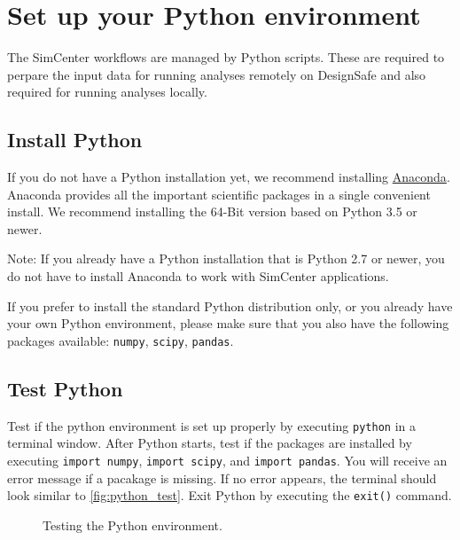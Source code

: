 \section{Set up your Python environment}

The SimCenter workflows are managed by Python scripts. These are required to perpare the input data for running analyses remotely on DesignSafe and also required for running analyses locally. 

\subsection{Install Python}

If you do not have a Python installation yet, we recommend installing \href{http://www.anaconda.com/distribution/#download-section}{Anaconda}. Anaconda provides all the important scientific packages in a single convenient install. We recommend installing the 64-Bit version based on Python 3.5 or newer.

Note: If you already have a Python installation that is Python 2.7 or newer, you do not have to install Anaconda to work with SimCenter applications.

If you prefer to install the standard Python distribution only, or you already have your own Python environment, please make sure that you also have the following packages available: \texttt{numpy}, \texttt{scipy}, \texttt{pandas}.

\subsection{Test Python}

Test if the python environment is set up properly by executing \texttt{python} in a terminal window. After Python starts, test if the packages are installed by executing \texttt{import numpy}, \texttt{import scipy}, and \texttt{import pandas}. You will receive an error message if a pacakage is missing. If no error appears, the terminal should look similar to \autoref{fig:python_test}. Exit Python by executing the \texttt{exit()} command.

\begin{figure}[!htbp]
  \caption{Testing the Python environment.}
  \label{fig:python_test}
\end{figure}

